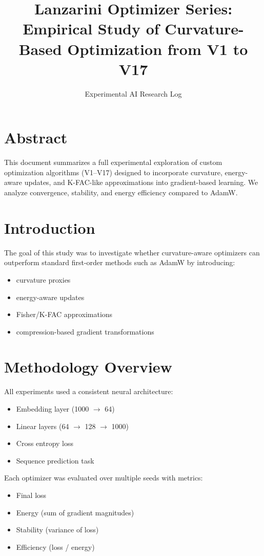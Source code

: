 \documentclass{article}
\title{Lanzarini Optimizer Series: Empirical Study of Curvature-Based Optimization from V1 to V17}
\author{Experimental AI Research Log}
\date{}
\begin{document}
\maketitle

\section{Abstract}

This document summarizes a full experimental exploration of custom optimization algorithms (V1–V17) designed to incorporate curvature, energy-aware updates, and K-FAC-like approximations into gradient-based learning. We analyze convergence, stability, and energy efficiency compared to AdamW.

\section{Introduction}

The goal of this study was to investigate whether curvature-aware optimizers can outperform standard first-order methods such as AdamW by introducing:

\begin{itemize}
    \item curvature proxies
    \item energy-aware updates
    \item Fisher/K-FAC approximations
    \item compression-based gradient transformations
\end{itemize}

\section{Methodology Overview}

All experiments used a consistent neural architecture:

\begin{itemize}
    \item Embedding layer (1000 $\rightarrow$ 64)
    \item Linear layers (64 $\rightarrow$ 128 $\rightarrow$ 1000)
    \item Cross entropy loss
    \item Sequence prediction task
\end{itemize}

Each optimizer was evaluated over multiple seeds with metrics:

\begin{itemize}
    \item Final loss
    \item Energy (sum of gradient magnitudes)
    \item Stability (variance of loss)
    \item Efficiency (loss / energy)
\end{itemize}
\end{document}
